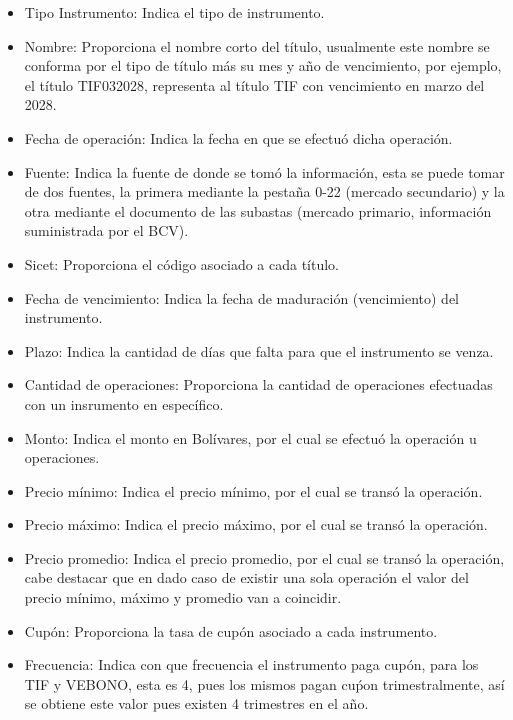 \begin{itemize}
  \item Tipo Instrumento: Indica el tipo de instrumento.
  \item Nombre: Proporciona el nombre corto del t\'itulo, usualmente este nombre se conforma por el tipo de t\'itulo m\'as su mes y a\~no de vencimiento, por ejemplo, el t\'itulo TIF032028, representa al t\'itulo TIF con vencimiento en marzo del 2028.
  \item Fecha de operaci\'on: Indica la fecha en que se efectu\'o dicha operaci\'on.
  \item Fuente: Indica la fuente de donde se tom\'o la informaci\'on, esta se puede tomar de dos fuentes, la primera mediante la pesta\~na 0-22 (mercado secundario) y  la otra mediante el documento de las subastas (mercado primario, informaci\'on suministrada por el BCV).
  \item Sicet: Proporciona el c\'odigo asociado a cada t\'itulo.
  \item Fecha de vencimiento: Indica la fecha de maduraci\'on (vencimiento) del instrumento.
  \item Plazo: Indica la cantidad de d\'ias que falta para que el instrumento se venza.
  \item Cantidad de operaciones: Proporciona la cantidad de operaciones efectuadas con un insrumento en espec\'ifico.
  \item Monto: Indica el monto en Bol\'ivares, por el cual se efectu\'o la operaci\'on u operaciones.
  \item Precio m\'inimo: Indica el precio m\'inimo, por el cual se trans\'o la operaci\'on.
  \item Precio m\'aximo: Indica el precio m\'aximo, por el cual se trans\'o la operaci\'on.
  \item Precio promedio: Indica el precio promedio, por el cual se trans\'o la operaci\'on, cabe destacar que en dado caso de existir una sola operaci\'on el valor del precio m\'inimo, m\'aximo y promedio van a coincidir.
  \item Cup\'on: Proporciona la tasa de cup\'on asociado a cada instrumento.
  \item Frecuencia: Indica con que frecuencia el instrumento paga cup\'on, para los TIF y VEBONO, esta es 4, pues los mismos pagan cu\'pon trimestralmente, as\'i se obtiene este valor pues existen 4 trimestres en el a\~no.

\end{itemize}

\vspace{0.5cm}

